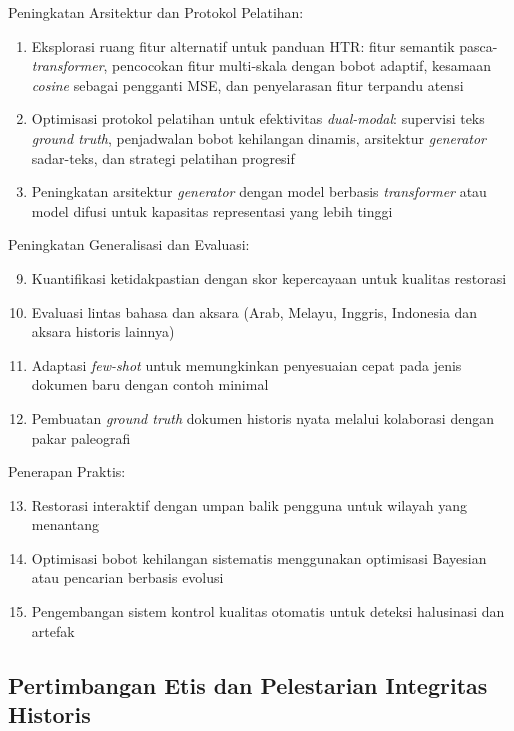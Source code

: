 \documentclass[journal]{IEEEtran}
\begin{document}
Peningkatan Arsitektur dan Protokol Pelatihan:
\begin{enumerate}
    \item Eksplorasi ruang fitur alternatif untuk panduan HTR: fitur semantik pasca-\textit{transformer}, pencocokan fitur multi-skala dengan bobot adaptif, kesamaan \textit{cosine} sebagai pengganti MSE, dan penyelarasan fitur terpandu atensi
    \item Optimisasi protokol pelatihan untuk efektivitas \textit{dual-modal}: supervisi teks \textit{ground truth}, penjadwalan bobot kehilangan dinamis, arsitektur \textit{generator} sadar-teks, dan strategi pelatihan progresif
    \item Peningkatan arsitektur \textit{generator} dengan model berbasis \textit{transformer} atau model difusi untuk kapasitas representasi yang lebih tinggi
\end{enumerate}

Peningkatan Generalisasi dan Evaluasi:
\begin{enumerate}
    \setcounter{enumi}{8}
    \item Kuantifikasi ketidakpastian dengan skor kepercayaan untuk kualitas restorasi
    \item Evaluasi lintas bahasa dan aksara (Arab, Melayu, Inggris, Indonesia dan aksara historis lainnya)
    \item Adaptasi \textit{few-shot} untuk memungkinkan penyesuaian cepat pada jenis dokumen baru dengan contoh minimal
    \item Pembuatan \textit{ground truth} dokumen historis nyata melalui kolaborasi dengan pakar paleografi
\end{enumerate}

Penerapan Praktis:
\begin{enumerate}
    \setcounter{enumi}{12}
    \item Restorasi interaktif dengan umpan balik pengguna untuk wilayah yang menantang
    \item Optimisasi bobot kehilangan sistematis menggunakan optimisasi Bayesian atau pencarian berbasis evolusi
    \item Pengembangan sistem kontrol kualitas otomatis untuk deteksi halusinasi dan artefak
\end{enumerate}

\subsection{Pertimbangan Etis dan Pelestarian Integritas Historis}
\end{document}
